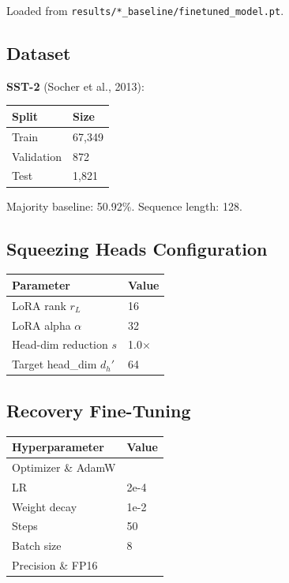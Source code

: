 Loaded from \texttt{results/*\_baseline/finetuned\_model.pt}.

\subsection{Dataset}

\textbf{SST-2} (Socher et al., 2013):

\begin{table}[H]
\centering
\small
\begin{tabular}{ll}
\toprule
\textbf{Split} & \textbf{Size} \\
\midrule
Train & 67,349 \\
Validation & 872 \\
Test & 1,821 \\
\bottomrule
\end{tabular}
\end{table}

Majority baseline: 50.92\%. Sequence length: 128.

\subsection{Squeezing Heads Configuration}

\begin{table}[H]
\centering
\small
\begin{tabular}{ll}
\toprule
\textbf{Parameter} & \textbf{Value} \\
\midrule
LoRA rank $r_L$ & 16 \\
LoRA alpha $\alpha$ & 32 \\
Head-dim reduction $s$ & 1.0$\times$ \\
Target head\_dim $d_h'$ & 64 \\
\bottomrule
\end{tabular}
\end{table}

\subsection{Recovery Fine-Tuning}

\begin{table}[H]
\centering
\small
\begin{tabular}{ll}
\toprule
\textbf{Hyperparameter} & \textbf{Value} \\
\midrule
Optimizer \& AdamW \\
LR & 2e-4 \\
Weight decay & 1e-2 \\
Steps & 50 \\
Batch size & 8 \\
Precision \& FP16 \\
\bottomrule
\end{tabular}
\end{table}

